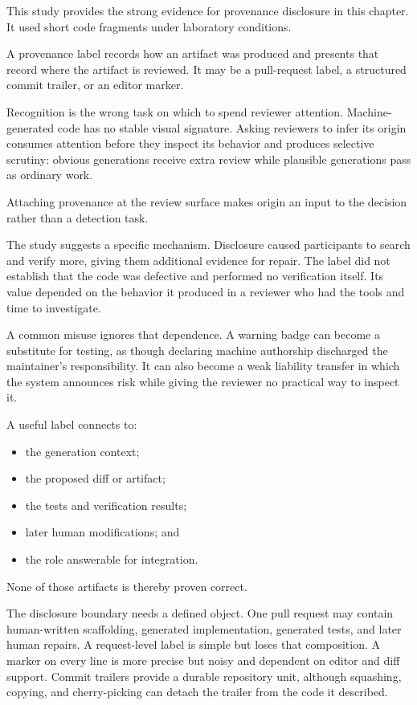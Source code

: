 This study provides the strong evidence for provenance disclosure in this chapter. It used short code fragments under laboratory conditions.

A provenance label records how an artifact was produced and presents that record where the artifact is reviewed. It may be a pull-request label, a structured commit trailer, or an editor marker.

Recognition is the wrong task on which to spend reviewer attention. Machine-generated code has no stable visual signature. Asking reviewers to infer its origin consumes attention before they inspect its behavior and produces selective scrutiny: obvious generations receive extra review while plausible generations pass as ordinary work.

Attaching provenance at the review surface makes origin an input to the decision rather than a detection task.

The study suggests a specific mechanism. Disclosure caused participants to search and verify more, giving them additional evidence for repair. The label did not establish that the code was defective and performed no verification itself. Its value depended on the behavior it produced in a reviewer who had the tools and time to investigate.

A common misuse ignores that dependence. A warning badge can become a substitute for testing, as though declaring machine authorship discharged the maintainer's responsibility. It can also become a weak liability transfer in which the system announces risk while giving the reviewer no practical way to inspect it.


A useful label connects to:

\begin{itemize}
\tightlist
\item
  the generation context;
\item
  the proposed diff or artifact;
\item
  the tests and verification results;
\item
  later human modifications; and
\item
  the role answerable for integration.
\end{itemize}

None of those artifacts is thereby proven correct.

The disclosure boundary needs a defined object. One pull request may contain human-written scaffolding, generated implementation, generated tests, and later human repairs. A request-level label is simple but loses that composition. A marker on every line is more precise but noisy and dependent on editor and diff support. Commit trailers provide a durable repository unit, although squashing, copying, and cherry-picking can detach the trailer from the code it described.

